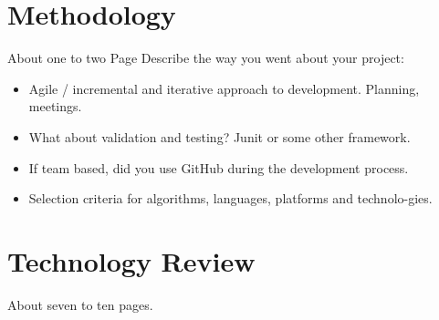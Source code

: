 \chapter{Methodology}
About one to two Page
Describe the way you went about your project:
\begin{itemize}
\item Agile / incremental and iterative approach to development. Planning, meetings.
\item What about validation and testing? Junit or some other framework.
\item If team based, did you use GitHub during the development process.
\item Selection criteria for algorithms, languages, platforms and technolo-gies.
\end{itemize}



\chapter{Technology Review}
About seven to ten pages.

